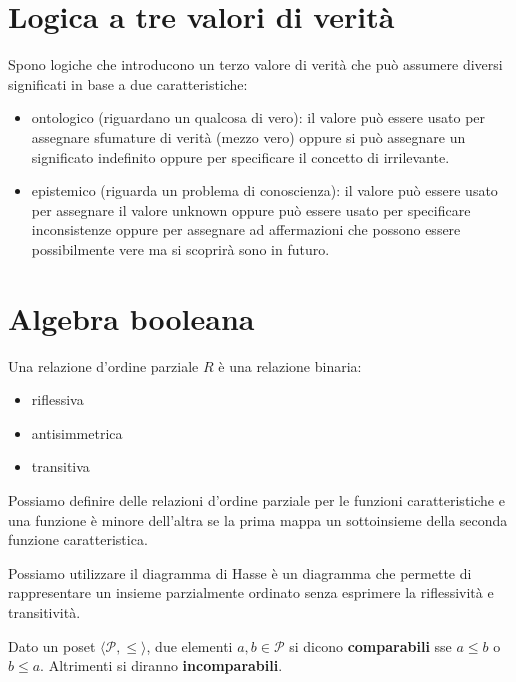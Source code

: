 \section{Logica a tre valori di verità}
Spono logiche che introducono un terzo valore di verità che può assumere diversi 
significati in base a due caratteristiche:
\begin{itemize}
    \item ontologico (riguardano un qualcosa di vero): il valore può essere usato per assegnare sfumature di verità (mezzo vero)
    oppure si può assegnare un significato indefinito oppure per specificare il 
    concetto di irrilevante.
    \item epistemico (riguarda un problema di conoscienza): il valore può essere 
    usato per assegnare il valore unknown oppure può essere usato per specificare 
    inconsistenze  oppure per assegnare ad affermazioni che possono essere possibilmente 
    vere ma si scoprirà sono in futuro.
\end{itemize}


\section{Algebra booleana}
\begin{definizione}
    Una relazione d'ordine parziale $R$ è una relazione binaria:
    \begin{itemize}
        \item riflessiva
        \item antisimmetrica
        \item transitiva
    \end{itemize}
\end{definizione}

\begin{esempio}
    Possiamo definire delle relazioni d'ordine parziale per le funzioni caratteristiche 
    e una funzione è minore dell'altra se la prima mappa un sottoinsieme della seconda 
    funzione caratteristica.
\end{esempio}

Possiamo utilizzare il diagramma di Hasse è un diagramma che permette di rappresentare 
un insieme parzialmente ordinato senza esprimere la riflessività e transitività.

\begin{definizione}
    Dato un poset $ \langle\mathcal{P}, \le \rangle$, due elementi 
    $a,b\in \mathcal{P}$ si dicono \textbf{comparabili} sse $a\le b$ o $b\le a$. Altrimenti 
    si diranno \textbf{incomparabili}.
\end{definizione}

